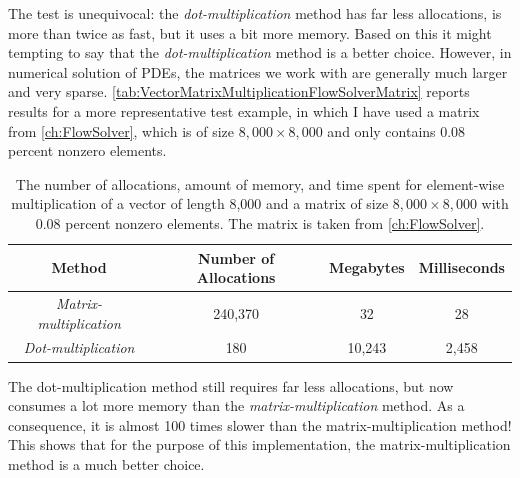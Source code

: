 The test is unequivocal:  the \textit{dot-multiplication} method has far less allocations, is more than twice as fast, but it uses a bit more memory. Based on this it might tempting to say that the \textit{dot-multiplication} method is a better choice. However, in numerical solution of PDEs, the matrices we work with are generally much larger and very sparse. \autoref{tab:VectorMatrixMultiplicationFlowSolverMatrix} reports results for a more representative test example, in which I have used a matrix from \autoref{ch:FlowSolver}, which is of size $8,000\times 8,000$ and only contains 0.08 percent nonzero elements.
\begin{table}[H]
    \centering
    \caption{The number of allocations, amount of memory, and time spent for element-wise multiplication of a vector of length 8,000 and a matrix of size $8,000\times 8,000$ with 0.08 percent nonzero elements. The matrix is taken from \autoref{ch:FlowSolver}.}
    \label{tab:VectorMatrixMultiplicationFlowSolverMatrix}
    \def\arraystretch{1.5}
    \begin{tabular}{cccc}
    \textbf{Method} & \textbf{Number of Allocations} & \textbf{Megabytes} & \textbf{Milliseconds} \\
        \hline
         \textit{Matrix-multiplication} & 240,370 & 32 & 28 \\  
         \textit{Dot-multiplication} & 180 & 10,243 & 2,458\\ 
         \hline
    \end{tabular}
\end{table}
The dot-multiplication method still requires far less allocations, but now consumes a lot more memory than the \textit{matrix-multiplication} method. As a consequence, it is almost 100 times slower than the matrix-multiplication method! This shows that for the purpose of this implementation, the matrix-multiplication method is a much better choice.

